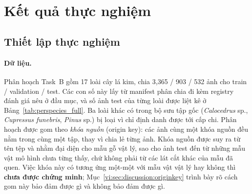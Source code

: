 %
%
%
%
%

\section{Kết quả thực nghiệm}
\label{vi:sec:results}

\subsection{Thiết lập thực nghiệm}
\label{vi:sec:results:setup}

\paragraph{Dữ liệu.} Phân hoạch Task~B gồm 17 loài cây lá kim, chia
3{,}365 / 903 / 532 ảnh cho train / validation / test. Các con số này lấy từ
manifest phân chia đi kèm registry đánh giá nêu ở đầu mục, và số ảnh test của
từng loài được liệt kê ở Bảng~\ref{tab:perspecies_full}. Ba loài khác có trong
bộ sưu tập gốc (\textit{Calocedrus} sp., \textit{Cupressus funebris},
\textit{Pinus} sp.) bị loại vì chỉ định danh được tới cấp chi. Phân hoạch được
gom theo \emph{khóa nguồn} (origin key): các ảnh cùng một khóa nguồn đều nằm
trong cùng một tập, thay vì chia lẻ từng ảnh. Khóa nguồn được suy ra từ tên
tệp và nhằm đại diện cho mẫu gỗ vật lý, sao cho ảnh test đến từ những mẫu vật
mô hình chưa từng thấy, chứ không phải từ các lát cắt khác của mẫu đã quen.
Việc khóa này có tương ứng một-một với mẫu vật vật lý hay không thì \textbf{chưa
được chứng minh}; Mục~\ref{vi:sec:discussion:originkey} trình bày rõ cách gom
này bảo đảm được gì và không bảo đảm được gì.


